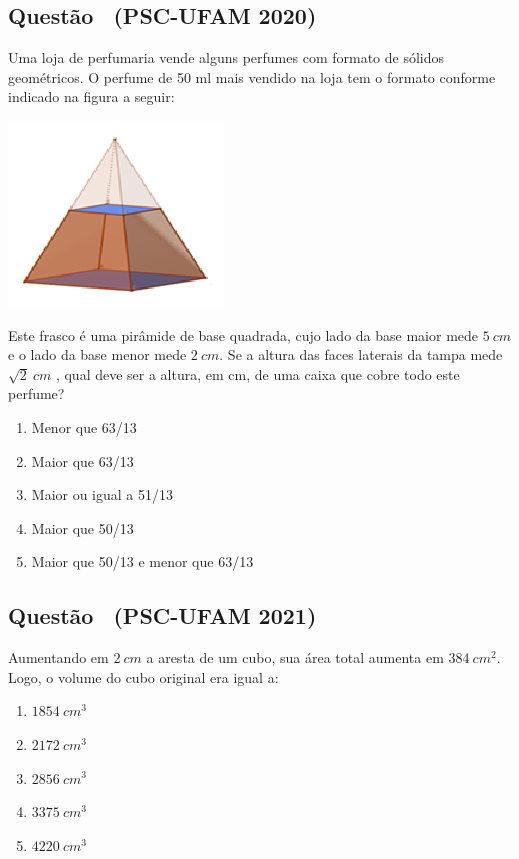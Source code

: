 \documentclass[12pt]{article}
\newif\ifmostravermelho
\newcommand{\vermelho}[1]{%
  \ifmostravermelho
    {\color{red}#1}%
  \else
    #1%
  \fi
}
\newcounter{questao}
\newcommand{\novaquestao}[1]{%
  \stepcounter{questao}%
  \subsection*{Questão \thequestao\ (#1)}%
}
\begin{document}
\begin{multicols}{2}
        \novaquestao{PSC-UFAM 2020}
            Uma loja de perfumaria vende alguns perfumes com formato de sólidos geométricos. O perfume de 50 ml mais vendido na loja tem o formato conforme indicado na figura a seguir:
            
            \begin{center}
                \includegraphics[scale=0.6]{q13.png}
            \end{center} Este frasco é uma pirâmide de base quadrada, cujo lado da base maior mede $5\ cm$ e o lado da base menor mede $2\ cm$. Se a altura das faces laterais da tampa mede $\sqrt{2}\ cm$ , qual deve ser a altura, em cm, de uma caixa que cobre todo este perfume?
        
            \begin{enumerate}[label=(\Alph*), noitemsep]
                \item Menor que {63}/{13}
                \item \vermelho{Maior que {63}/{13}} %
                \item Maior ou igual a {51}/{13}
                \item Maior que {50}/{13}
                \item Maior que {50}/{13} e menor que {63}/{13}
            \end{enumerate}
        
        \novaquestao{PSC-UFAM 2021}
            Aumentando em $2\ cm$ a aresta de um cubo, sua área total aumenta em $384\ cm^{2}$. Logo, o volume do cubo original era igual a: 
        
            \begin{enumerate}[label=(\Alph*), noitemsep]
                \item $1854\ cm^{3}$
                \item $2172\ cm^{3}$
                \item $2856\ cm^{3}$
                \item \vermelho{$3375\ cm^{3}$} %
                \item $4220\ cm^{3}$
            \end{enumerate}
        

\end{multicols}
\end{document}

